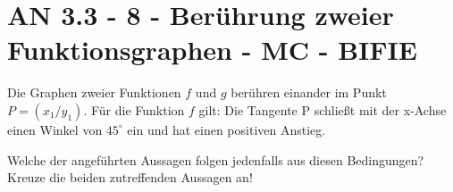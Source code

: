 \section{AN 3.3 - 8 - Berührung zweier Funktionsgraphen - MC - BIFIE}

\begin{beispiel}[AN 3.3]{1} %
				Die Graphen zweier Funktionen $f$ und $g$ berühren einander im Punkt $P=(x_1/y_1)$. Für die Funktion $f$ gilt: Die Tangente P schließt mit der x-Achse einen Winkel von $45^\circ$ ein und hat einen positiven Anstieg.
				
				Welche der angeführten Aussagen folgen jedenfalls aus diesen Bedingungen? Kreuze die beiden zutreffenden Aussagen an!
				
\end{beispiel}